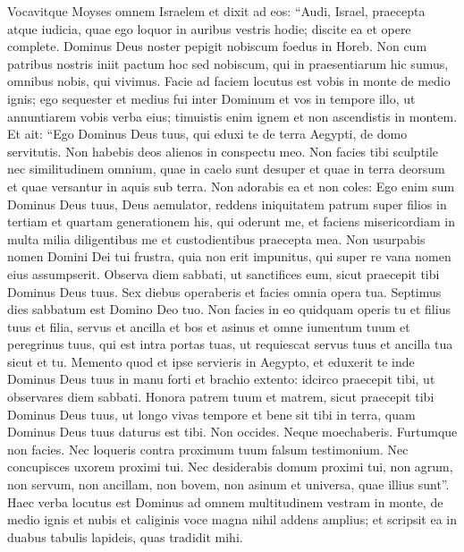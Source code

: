 \begin{biblechapter} 
\verse Vocavitque Moyses omnem Israelem et dixit ad eos: “Audi, Israel, praecepta atque iudicia, quae ego loquor in auribus vestris hodie; discite ea et opere complete. 
\verse Dominus Deus noster pepigit nobiscum foedus in Horeb. 
\verse Non cum patribus nostris iniit pactum hoc sed nobiscum, qui in praesentiarum hic sumus, omnibus nobis, qui vivimus. 
\verse Facie ad faciem locutus est vobis in monte de medio ignis;  
\verse ego sequester et medius fui inter Dominum et vos in tempore illo, ut annuntiarem vobis verba eius; timuistis enim ignem et non ascendistis in montem. Et ait: 
\verse “Ego Dominus Deus tuus, qui eduxi te de terra Aegypti, de domo servitutis. 
\verse Non habebis deos alienos in conspectu meo. 
\verse Non facies tibi sculptile nec similitudinem omnium, quae in caelo sunt desuper et quae in terra deorsum et quae versantur in aquis sub terra. 
\verse Non adorabis ea et non coles: Ego enim sum Dominus Deus tuus, Deus aemulator, reddens iniquitatem patrum super filios in tertiam et quartam generationem his, qui oderunt me, 
\verse et faciens misericordiam in multa milia diligentibus me et custodientibus praecepta mea. 
\verse Non usurpabis nomen Domini Dei tui frustra, quia non erit impunitus, qui super re vana nomen eius assumpserit. 
\verse Observa diem sabbati, ut sanctifices eum, sicut praecepit tibi Dominus Deus tuus. 
\verse Sex diebus operaberis et facies omnia opera tua. 
\verse Septimus dies sabbatum est Domino Deo tuo. Non facies in eo quidquam operis tu et filius tuus et filia, servus et ancilla et bos et asinus et omne iumentum tuum et peregrinus tuus, qui est intra portas tuas, ut requiescat servus tuus et ancilla tua sicut et tu. 
\verse Memento quod et ipse servieris in Aegypto, et eduxerit te inde Dominus Deus tuus in manu forti et brachio extento: idcirco praecepit tibi, ut observares diem sabbati. 
\verse Honora patrem tuum et matrem, sicut praecepit tibi Dominus Deus tuus, ut longo vivas tempore et bene sit tibi in terra, quam Dominus Deus tuus daturus est tibi. 
\verse Non occides. 
\verse Neque moechaberis. 
\verse Furtumque non facies. 
\verse Nec loqueris contra proximum tuum falsum testimonium. 
\verse Nec concupisces uxorem proximi tui. Nec desiderabis domum proximi tui, non agrum, non servum, non ancillam, non bovem, non asinum et universa, quae illius sunt”. 
\verse Haec verba locutus est Dominus ad omnem multitudinem vestram in monte, de medio ignis et nubis et caliginis voce magna nihil addens amplius; et scripsit ea in duabus tabulis lapideis, quas tradidit mihi. 

\end{biblechapter}
